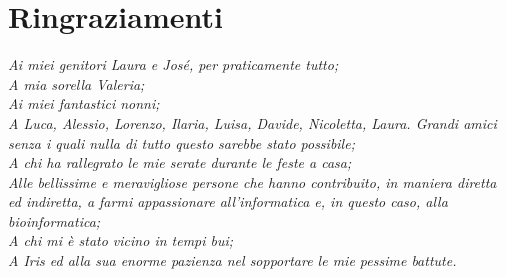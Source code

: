 \chapter*{\centering Ringraziamenti}
\begin{flushright}
    \textit{
        Ai miei genitori Laura e José, per praticamente tutto; \\
        A mia sorella Valeria; \\
        Ai miei fantastici nonni; \\
        A Luca, Alessio, Lorenzo, Ilaria, Luisa, Davide, Nicoletta, Laura. Grandi amici senza i quali nulla di tutto questo sarebbe stato possibile; \\
        A chi ha rallegrato le mie serate durante le feste a casa; \\
        Alle bellissime e meravigliose persone che hanno contribuito, in maniera diretta ed indiretta, a farmi appassionare all'informatica e, in questo caso, alla bioinformatica; \\
        A chi mi è stato vicino in tempi bui; \\
        A Iris ed alla sua enorme pazienza nel sopportare le mie pessime battute.
    }
\end{flushright}

 \null
